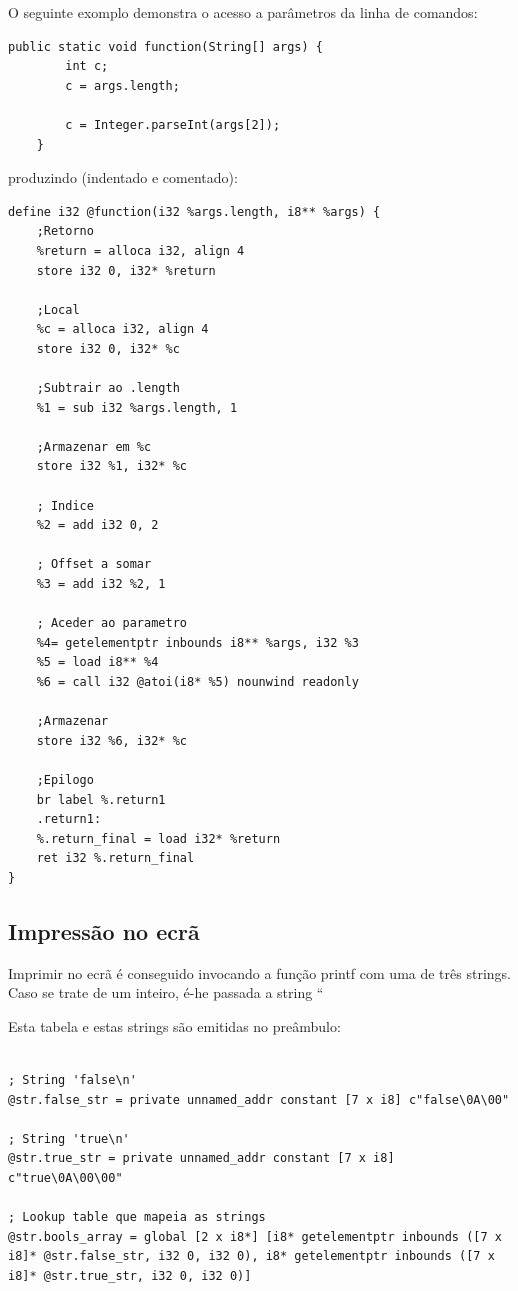 \documentclass[11pt,a4paper]{article}
\begin{document}
O seguinte exomplo demonstra o acesso a parâmetros da linha de comandos:

\begin{lstlisting}
public static void function(String[] args) {
        int c;
        c = args.length;

        c = Integer.parseInt(args[2]);
    }
\end{lstlisting}

produzindo (indentado e comentado):

\begin{lstlisting}
define i32 @function(i32 %args.length, i8** %args) {
    ;Retorno
    %return = alloca i32, align 4
    store i32 0, i32* %return

    ;Local
    %c = alloca i32, align 4
    store i32 0, i32* %c

    ;Subtrair ao .length
    %1 = sub i32 %args.length, 1

    ;Armazenar em %c
    store i32 %1, i32* %c

    ; Indice
    %2 = add i32 0, 2

    ; Offset a somar
    %3 = add i32 %2, 1

    ; Aceder ao parametro
    %4= getelementptr inbounds i8** %args, i32 %3
    %5 = load i8** %4
    %6 = call i32 @atoi(i8* %5) nounwind readonly

    ;Armazenar
    store i32 %6, i32* %c

    ;Epilogo
    br label %.return1
    .return1:
    %.return_final = load i32* %return
    ret i32 %.return_final
}
\end{lstlisting}

\subsection{Impressão no ecrã}

Imprimir no ecrã é conseguido invocando a função printf com uma de três strings. Caso se trate de um inteiro, é-he passada a string ``%

Esta tabela e estas strings são emitidas no preâmbulo:

\begin{lstlisting}

; String 'false\n'
@str.false_str = private unnamed_addr constant [7 x i8] c"false\0A\00"

; String 'true\n'
@str.true_str = private unnamed_addr constant [7 x i8] c"true\0A\00\00"

; Lookup table que mapeia as strings
@str.bools_array = global [2 x i8*] [i8* getelementptr inbounds ([7 x i8]* @str.false_str, i32 0, i32 0), i8* getelementptr inbounds ([7 x i8]* @str.true_str, i32 0, i32 0)]
\end{lstlisting}
\end{document}
